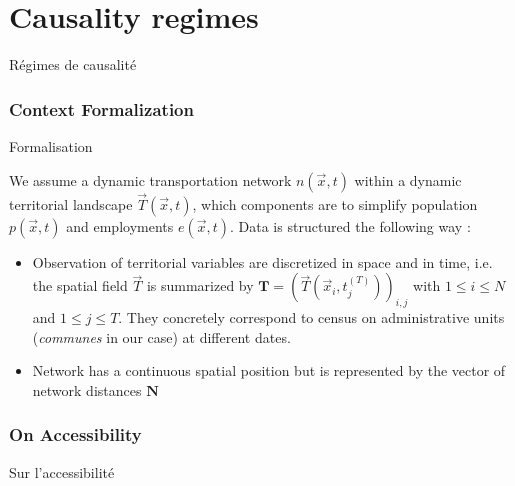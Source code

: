 \newpage


\section{Causality regimes}{Régimes de causalité}

\label{app:sec:causalityregimes}






\subsubsection{Context Formalization}{Formalisation}



We assume a dynamic transportation network $n(\vec{x},t)$ within a dynamic territorial landscape $\vec{T}(\vec{x},t)$, which components are to simplify population $p(\vec{x},t)$ and employments $e(\vec{x},t)$. Data is structured the following way :
\begin{itemize}
\item Observation of territorial variables are discretized in space and in time, i.e. the spatial field $\vec{T}$ is summarized by $\mathbf{T} = \left(\vec{T}(\vec{x}_i,t_j^{(T)})\right)_{i,j}$ with $1\leq i \leq N$ and $1\leq j \leq T$. They concretely correspond to census on administrative units (\emph{communes} in our case) at different dates.
\item Network has a continuous spatial position but is represented by the vector of network distances $\mathbf{N}$ 
\end{itemize}






\subsubsection{On Accessibility}{Sur l'accessibilité}

